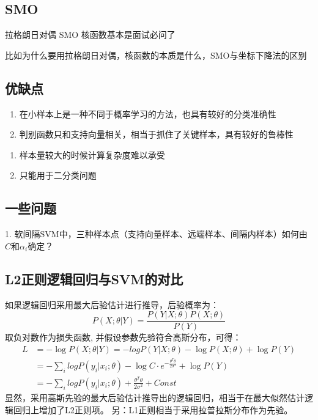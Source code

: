 \subsection{SMO}
拉格朗日对偶
SMO
核函数基本是面试必问了

比如为什么要用拉格朗日对偶，核函数的本质是什么，SMO与坐标下降法的区别

\subsection{优缺点}
{}
\begin{enumerate}
\item 在小样本上是一种不同于概率学习的方法，也具有较好的分类准确性
\item 判别函数只和支持向量相关，相当于抓住了关键样本，具有较好的鲁棒性
\end{enumerate}

{}
\begin{enumerate}
\item 样本量较大的时候计算复杂度难以承受
\item 只能用于二分类问题
\end{enumerate}

\subsection{一些问题}
1. 软间隔SVM中，三种样本点（支持向量样本、远端样本、间隔内样本）如何由$C$和$\alpha_i$确定？


\subsection{L2正则逻辑回归与SVM的对比}
如果逻辑回归采用最大后验估计进行推导，后验概率为：
\begin{equation*}
    P(X;\theta|Y) = \frac{P(Y|X;\theta)P(X;\theta)}{P(Y)}
\end{equation*}
取负对数作为损失函数, 并假设参数先验符合高斯分布，可得：
\begin{align*}
    L &= -\log P(X;\theta|Y) = -log P(Y|X;\theta) - \log P(X;\theta) + \log P(Y) \\
    &= -\sum_i log P(y_i|x_i;\theta) - \log C\cdot e^{-\frac{\theta^T\theta}{2\sigma^2}} + \log P(Y) \\
    &= -\sum_i log P(y_i|x_i;\theta) + \frac{\theta^T\theta}{2\sigma^2} + Const
\end{align*}
显然，采用高斯先验的最大后验估计推导出的逻辑回归，相当于在最大似然估计逻辑回归上增加了L2正则项。
另：L1正则相当于采用拉普拉斯分布作为先验。

